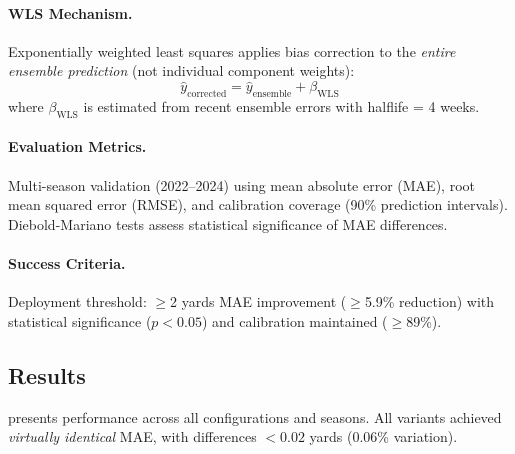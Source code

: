 \paragraph{WLS Mechanism.}
Exponentially weighted least squares applies bias correction to the \textit{entire ensemble prediction} (not individual component weights):
\begin{equation}
  \hat{y}_{\text{corrected}} = \hat{y}_{\text{ensemble}} + \beta_{\text{WLS}}
\end{equation}
where $\beta_{\text{WLS}}$ is estimated from recent ensemble errors with halflife = 4 weeks.

\paragraph{Evaluation Metrics.}
Multi-season validation (2022--2024) using mean absolute error (MAE), root mean squared error (RMSE), and calibration coverage (90\% prediction intervals). Diebold-Mariano tests assess statistical significance of MAE differences.

\paragraph{Success Criteria.}
Deployment threshold: $\ge$2 yards MAE improvement ($\ge$5.9\% reduction) with statistical significance ($p<0.05$) and calibration maintained ($\ge$89\%).

\subsection{Results}

 presents performance across all configurations and seasons. All variants achieved \textit{virtually identical} MAE, with differences $<0.02$ yards (0.06\% variation).

